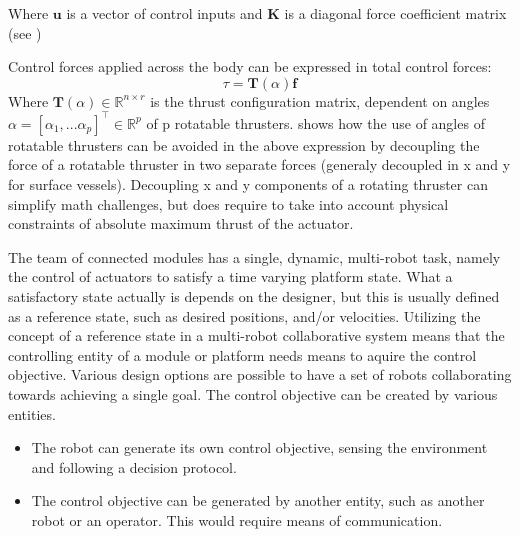 Where $\textbf{u}$ is a vector of control inputs and $\textbf{K}$ is a diagonal force coefficient matrix (see \citet{fossen2011handbook})

Control forces applied across the body can be expressed in total control forces:
\begin{equation}
\tau = \textbf{T}(\alpha)\textbf{f}
\end{equation}
Where $ \textbf{T}(\alpha) \in \mathbb{R}^{n\times r}$ is the thrust configuration matrix, dependent on angles $ \alpha = [\alpha_1,... \alpha_p]^\top \in \mathbb{R}^{p}$ of p rotatable thrusters. \citet{fossen2011handbook} shows how the use of angles of rotatable thrusters can be avoided in the above expression by decoupling the force of a rotatable thruster in two separate forces (generaly decoupled in x and y for surface vessels). Decoupling x and y components of a rotating thruster can simplify math challenges, but does require to take into account physical constraints of absolute maximum thrust of the actuator. 



The team of connected modules has a single, dynamic, multi-robot task, namely the control of actuators to satisfy a time varying platform state. What a satisfactory state actually is depends on the designer, but this is usually defined as a reference state, such as desired positions, and/or velocities.  Utilizing the concept of a reference state in a multi-robot collaborative system means that the controlling entity of a module or platform needs means to aquire the control objective. Various design options are possible to have a set of robots collaborating towards  achieving a single goal. The control objective can be created by various entities.
\begin{itemize}
	\item The robot can generate its own control objective, sensing the environment and following a decision protocol. 
	\item The control objective can be generated by another entity, such as another robot or an operator. This would require means of communication. 
\end{itemize}

